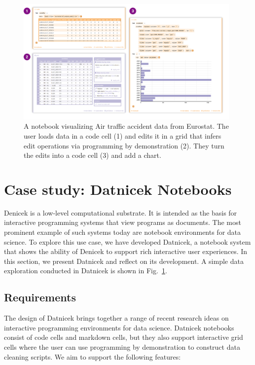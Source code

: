 \documentclass[sigconf]{acmart}
\begin{document}
\begin{figure}[t]
\vspace{-0.5em}
\includegraphics[width=0.98\textwidth,clip,trim=0cm 1cm 1cm 0.5cm]{fig/datnicek.pdf}
\vspace{-0.5em}
\caption{A notebook visualizing Air traffic accident data from Eurostat. The user loads data in
a code cell (1) and edits it in a grid that infers edit operations via programming by demonstration
(2). They turn the edits into a code cell (3) and add a chart.}
\label{fig:datnicek}
\end{figure}


\section{Case study: Datnicek Notebooks}
\label{sec:case}

Denicek is a low-level computational substrate. It is intended as the basis for interactive
programming systems that view programs as documents. The most prominent example of such systems
today are notebook environments for data science. To explore this use case, we have developed
Datnicek, a notebook system that shows the ability of Denicek to support rich interactive user
experiences. In this section, we present Datnicek and reflect on its development. A simple data
exploration conducted in Datnicek is shown in Fig.~\ref{fig:datnicek}.

\subsection{Requirements}
\label{sec:case-req}

The design of Datnicek brings together a range of recent research ideas on interactive programming
environments for data science. Datnicek notebooks consist of code cells and markdown cells, but
they also support interactive grid cells where the user can use programming by demonstration to
construct data cleaning scripts. We aim to support the following features:
\end{document}
